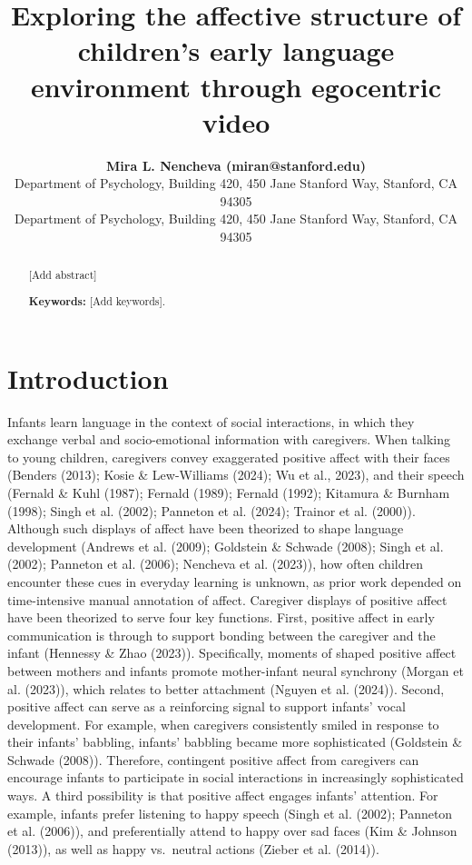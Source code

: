 \documentclass[10pt, letterpaper]{article}
\title{Exploring the affective structure of children's early language
environment through egocentric video}
\author{{\large \bf Mira L. Nencheva (miran@stanford.edu)} \\ Department of Psychology, Building 420, 450 Jane Stanford Way, Stanford, CA 94305 \AND {\large \bf Michael C. Frank (mcfrank@stanford.edu)} \\ Department of Psychology, Building 420, 450 Jane Stanford Way, Stanford, CA 94305}
\begin{document}
\maketitle

\begin{abstract}
{[}Add abstract{]}

\textbf{Keywords:}
{[}Add keywords{]}.
\end{abstract}

\section{Introduction}\label{introduction}

Infants learn language in the context of social interactions, in which
they exchange verbal and socio-emotional information with caregivers.
When talking to young children, caregivers convey exaggerated positive
affect with their faces (Benders (2013); Kosie \& Lew-Williams (2024);
Wu et al., 2023), and their speech (Fernald \& Kuhl (1987); Fernald
(1989); Fernald (1992); Kitamura \& Burnham (1998); Singh et al. (2002);
Panneton et al. (2024); Trainor et al. (2000)). Although such displays
of affect have been theorized to shape language development (Andrews et
al. (2009); Goldstein \& Schwade (2008); Singh et al. (2002); Panneton
et al. (2006); Nencheva et al. (2023)), how often children encounter
these cues in everyday learning is unknown, as prior work depended on
time-intensive manual annotation of affect. Caregiver displays of
positive affect have been theorized to serve four key functions. First,
positive affect in early communication is through to support bonding
between the caregiver and the infant (Hennessy \& Zhao (2023)).
Specifically, moments of shaped positive affect between mothers and
infants promote mother-infant neural synchrony (Morgan et al. (2023)),
which relates to better attachment (Nguyen et al. (2024)). Second,
positive affect can serve as a reinforcing signal to support infants'
vocal development. For example, when caregivers consistently smiled in
response to their infants' babbling, infants' babbling became more
sophisticated (Goldstein \& Schwade (2008)). Therefore, contingent
positive affect from caregivers can encourage infants to participate in
social interactions in increasingly sophisticated ways. A third
possibility is that positive affect engages infants' attention. For
example, infants prefer listening to happy speech (Singh et al. (2002);
Panneton et al. (2006)), and preferentially attend to happy over sad
faces (Kim \& Johnson (2013)), as well as happy vs.~neutral actions
(Zieber et al. (2014)).
\end{document}
